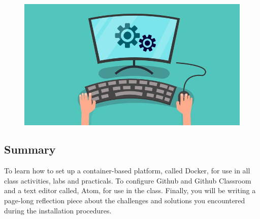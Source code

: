 
\newcommand{\command}[1]{``\lstinline{#1}''}
\newcommand{\program}[1]{\lstinline{#1}}
\newcommand{\channel}[1]{\lstinline{#1}}
\newcommand{\option}[1]{``{#1}''}
\newcommand{\step}[1]{``{#1}''}


\long{}




\flushleft



\begin{figure}[ht!]
	\begin{center}
	 \includegraphics[scale=.3]{graphics/installing.jpg}
	\end{center}
\end{figure}

\subsection*{Summary}
To learn how to set up a container-based platform, called Docker, for use in all class activities, labs and practicals. To configure Github and Github Classroom and a text editor called, Atom, for use in the class. Finally, you will be writing a page-long reflection piece about the challenges and solutions you encountered during the installation procedures.



